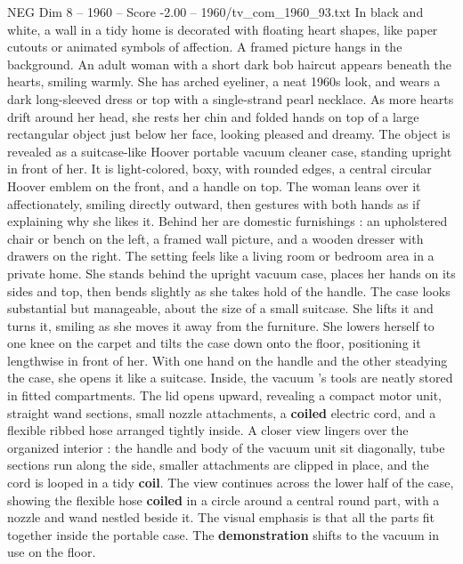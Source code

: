 \begin{textsample}{NEG Dim 8 – 1960 – Score -2.00 – 1960/tv\_com\_1960\_93.txt}  \label{ex:f8_neg_018}
In black and white, a wall in a tidy home is decorated with floating heart shapes, like paper cutouts or animated symbols of affection.
A framed picture hangs in the background.
An adult woman with a short dark bob haircut appears beneath the hearts, smiling warmly.
She has arched eyeliner, a neat 1960s look, and wears a dark long-sleeved dress or top with a single-strand pearl necklace.
As more hearts drift around her head, she rests her chin and folded hands on top of a large rectangular object just below her face, looking pleased and dreamy.
The object is revealed as a suitcase-like Hoover portable vacuum cleaner case, standing upright in front of her.
It is light-colored, boxy, with rounded edges, a central circular Hoover emblem on the front, and a handle on top.
The woman leans over it affectionately, smiling directly outward, then gestures with both hands as if explaining why she likes it.
Behind her are domestic furnishings : an upholstered chair or bench on the left, a framed wall picture, and a wooden dresser with drawers on the right.
The setting feels like a living room or bedroom area in a private home.
She stands behind the upright vacuum case, places her hands on its sides and top, then bends slightly as she takes hold of the handle.
The case looks substantial but manageable, about the size of a small suitcase.
She lifts it and turns it, smiling as she moves it away from the furniture.
She lowers herself to one knee on the carpet and tilts the case down onto the floor, positioning it lengthwise in front of her.
With one hand on the handle and the other steadying the case, she opens it like a suitcase.
Inside, the vacuum ’s tools are neatly stored in fitted compartments.
The lid opens upward, revealing a compact motor unit, straight wand sections, small nozzle attachments, a \textbf{coiled} electric cord, and a flexible ribbed hose arranged tightly inside.
A closer view lingers over the organized interior : the handle and body of the vacuum unit sit diagonally, tube sections run along the side, smaller attachments are clipped in place, and the cord is looped in a tidy \textbf{coil}.
The view continues across the lower half of the case, showing the flexible hose \textbf{coiled} in a circle around a central round part, with a nozzle and wand nestled beside it.
The visual emphasis is that all the parts fit together inside the portable case.
The \textbf{demonstration} shifts to the vacuum in use on the floor.

\end{textsample}
